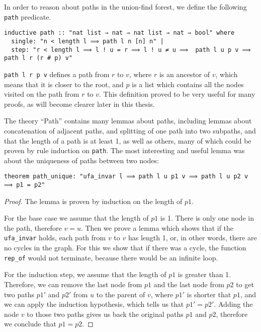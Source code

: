 In order to reason about paths in the union-find forest, we define the following \lstinline{path} predicate.

\begin{lstlisting}
inductive path :: "nat list ⇒ nat ⇒ nat list ⇒ nat ⇒ bool" where
  single: "n < length l ⟹ path l n [n] n" |
  step: "r < length l ⟹ l ! u = r ⟹ l ! u ≠ u ⟹  path l u p v ⟹ path l r (r # p) v"
\end{lstlisting}

\lstinline{path l r p v} defines a path from $r$ to $v$, where $r$ is an ancestor of $v$, which means that it is closer to the root, and $p$ is a list which contains all the nodes visited on the path from $r$ to $v$. This definition proved to be very useful for many proofs, as will become clearer later in this thesis.

The theory ``Path'' contains many lemmas about paths, including lemmas about concatenation of adjacent paths, and splitting of one path into two subpaths, and that the length of a path is at least 1, as well as others, many of which could be proven by rule induction on \lstinline{path}. The most interesting and useful lemma was about the uniqueness of paths between two nodes:

\begin{lstlisting}
theorem path_unique: "ufa_invar l ⟹ path l u p1 v ⟹ path l u p2 v ⟹ p1 = p2"
\end{lstlisting}

\begin{proof}
The lemma is proven by induction on the length of $p1$.

For the base case we assume that the length of $p1$ is 1. There is only one node in the path, therefore $v = u$. Then we prove a lemma which shows that if the \lstinline{ufa_invar} holds, each path from $v$ to $v$ has length 1, or, in other words, there are no cycles in the graph. For this we show that if there was a cycle, the function \lstinline{rep_of} would not terminate, because there would be an infinite loop.

For the induction step, we assume that the length of $p1$ is greater than 1. Therefore, we can remove the last node from $p1$ and the last node from $p2$ to get two paths $p1'$ and $p2'$ from $u$ to the parent of $v$, where $p1'$ is shorter that $p1$, and we can apply the induction hypothesis, which tells us that $p1' = p2'$. Adding the node $v$ to those two paths gives us back the original paths $p1$ and $p2$, therefore we conclude that $p1 = p2$.
\end{proof}

